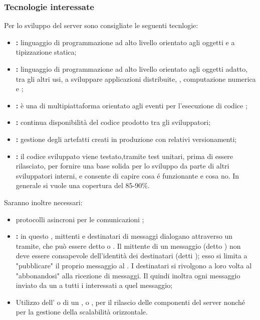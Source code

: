 	\subsubsection{Tecnologie interessate}
		Per lo sviluppo del server  sono consigliate le seguenti tecnlogie:
		\begin{itemize}
			\item \textbf{:} linguaggio di programmazione ad alto livello orientato agli oggetti e a tipizzazione statica;
			\item \textbf{:} linguaggio di programmazione ad alto livello orientato agli oggetti adatto, tra gli altri usi, a sviluppare applicazioni distribuite, , computazione numerica e ;
			\item \textbf{:} è una  di   multipiattaforma orientato agli eventi per l'esecuzione di codice ;
			\item \textbf{:} continua disponibilità del codice prodotto tra gli sviluppatori;
			\item \textbf{:} gestione degli artefatti creati in produzione con relativi versionamenti;
			\item \textbf{:} il codice sviluppato viene testato,tramite test unitari, prima di essere rilasciato, per fornire una base solida per lo sviluppo da parte di altri sviluppatori interni, e consente di capire cosa é funzionante e cosa no. In generale si vuole una copertura del 85-90\%.
		\end{itemize}
		Saranno inoltre necessari:
		\begin{itemize}
			\item protocolli asincroni per le comunicazioni ;
			\item \textbf{:} in questo , mittenti e destinatari di messaggi dialogano attraverso un tramite, che può essere detto  o . Il mittente di un messaggio (detto ) non deve essere consapevole dell'identità dei destinatari (detti ); esso si limita a "pubblicare" il proprio messaggio al . I destinatari si rivolgono a loro volta al  "abbonandosi" alla ricezione di messaggi. Il  quindi inoltra ogni messaggio inviato da un  a tutti i  interessati a quel messaggio;
			\item Utilizzo dell’  o di un ,  o , per il rilascio delle componenti del server nonché per la gestione della scalabilità orizzontale.
		\end{itemize}

